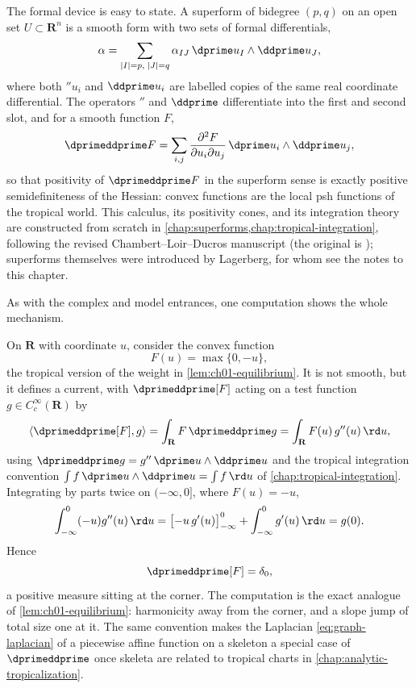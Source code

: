 The formal device is easy to state.  A superform of bidegree $(p,q)$ on an
open set $U\subset\mathbf R^n$ is a smooth form with two sets of formal
differentials,
\[
   \alpha=\sum_{|I|=p,\;|J|=q}
     \alpha_{IJ}\,\dprime u_I\wedge\ddprime u_J ,
\]
where both $\dprime u_i$ and $\ddprime u_i$ are labelled copies of the same
real coordinate differential.  The operators $\dprime$ and $\ddprime$
differentiate into the first and second slot, and for a smooth function $F$,
\[
 \dprimeddprime F
 =\sum_{i,j}\frac{\partial^2F}{\partial u_i\partial u_j}
   \,\dprime u_i\wedge\ddprime u_j ,
\]
so that positivity of $\dprimeddprime F$ in the superform sense is exactly
positive semidefiniteness of the Hessian: convex functions are the local psh
functions of the tropical world.  This calculus, its positivity cones, and
its integration theory are constructed from scratch in
\cref{chap:superforms,chap:tropical-integration}, following the revised
Chambert--Loir--Ducros manuscript \cite{CLD25} (the original is
\cite{CLD12}); superforms themselves were introduced by Lagerberg, for whom
see the notes to this chapter.

As with the complex and model entrances, one computation shows the whole
mechanism.

\begin{example}
\label{ex:ch01-lagerberg-corner}
On $\mathbf R$ with coordinate $u$, consider the convex function
\[
   F(u)=\max\{0,-u\},
\]
the tropical version of the weight in \cref{lem:ch01-equilibrium}.  It is
not smooth, but it defines a current, with
$\dprimeddprime[F]$ acting on a test function
$g\in C^\infty_c(\mathbf R)$ by
\[
 \langle\dprimeddprime[F],g\rangle
 =\int_{\mathbf R}F\,\dprimeddprime g
 =\int_{\mathbf R}F(u)\,g''(u)\,\rd u ,
\]
using $\dprimeddprime g=g''\,\dprime u\wedge\ddprime u$ and the tropical
integration convention
$\int f\,\dprime u\wedge\ddprime u=\int f\,\rd u$ of
\cref{chap:tropical-integration}.  Integrating by parts twice on
$(-\infty,0]$, where $F(u)=-u$,
\[
 \int_{-\infty}^0(-u)g''(u)\,\rd u
 =\bigl[-u\,g'(u)\bigr]_{-\infty}^0
   +\int_{-\infty}^0 g'(u)\,\rd u
 =g(0).
\]
Hence
\[
   \dprimeddprime[F]=\delta_0 ,
\]
a positive measure sitting at the corner.  The computation is the exact
analogue of \cref{lem:ch01-equilibrium}: harmonicity away from the corner,
and a slope jump of total size one at it.  The same convention makes the
Laplacian \eqref{eq:graph-laplacian} of a piecewise affine function on a
skeleton a special case of $\dprimeddprime$ once skeleta are related to
tropical charts in \cref{chap:analytic-tropicalization}.
\end{example}

